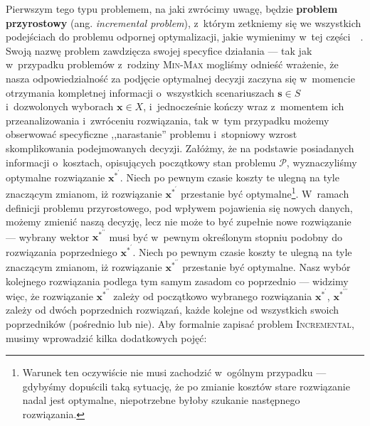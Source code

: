 Pierwszym tego typu problemem, na jaki zwrócimy uwagę, będzie \textbf{problem przyrostowy} (ang. \textit{incremental problem}), z~którym zetkniemy się we wszystkich podejściach do problemu odpornej optymalizacji, jakie wymienimy w~tej części~\cite[$1$-$2$]{DBLP:journals/corr/NasrabadiO13}~\cite[$586$]{incNetOpt}.
Swoją nazwę problem zawdzięcza swojej specyfice działania --- tak jak w~przypadku problemów z~rodziny \textsc{Min-Max} mogliśmy odnieść wrażenie, że nasza odpowiedzialność za podjęcie optymalnej decyzji zaczyna się w~momencie otrzymania kompletnej informacji o~wszystkich scenariuszach $\textbf{s} \in S$ i~dozwolonych wyborach $\textbf{x} \in X$, i~jednocześnie kończy wraz z~momentem ich przeanalizowania i~zwróceniu rozwiązania, tak w~tym przypadku możemy obserwować specyficzne ,,narastanie'' problemu i~stopniowy wzrost skomplikowania podejmowanych decyzji.
Załóżmy, że na podstawie posiadanych informacji o~kosztach, opisujących początkowy stan problemu $\mathcal{P}$, wyznaczyliśmy optymalne rozwiązanie $\textbf{x}^{\ast^{\prime}}$.
Niech po pewnym czasie koszty te ulegną na tyle znaczącym zmianom, iż rozwiązanie $\textbf{x}^{\ast^{\prime}}$ przestanie być optymalne\footnote{
	Warunek ten oczywiście nie musi zachodzić w~ogólnym przypadku --- gdybyśmy dopuścili taką sytuację, że po zmianie kosztów stare rozwiązanie nadal jest optymalne, niepotrzebne byłoby szukanie następnego rozwiązania.
	}.
W~ramach definicji problemu przyrostowego, pod wpływem pojawienia się nowych danych, możemy zmienić naszą decyzję, lecz nie może to być zupełnie nowe rozwiązanie --- wybrany wektor $\textbf{x}^{\ast^{\prime\prime}}$ musi być w~pewnym określonym stopniu podobny do rozwiązania poprzedniego $\textbf{x}^{\ast^{\prime}}$.
Niech po pewnym czasie koszty te ulegną na tyle znaczącym zmianom, iż rozwiązanie $\textbf{x}^{\ast^{\prime\prime}}$ przestanie być optymalne.
Nasz wybór kolejnego rozwiązania podlega tym samym zasadom co poprzednio --- widzimy więc, że rozwiązanie $\textbf{x}^{\ast^{\prime\prime}}$ zależy od początkowo wybranego rozwiązania $\textbf{x}^{\ast^{\prime}}$, $\textbf{x}^{\ast^{\prime\prime\prime}}$ zależy od dwóch poprzednich rozwiązań, każde kolejne od wszystkich swoich poprzedników (pośrednio lub nie).
Aby formalnie zapisać problem \textsc{Incremental}, musimy wprowadzić kilka dodatkowych pojęć:

